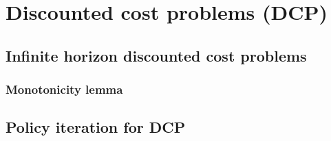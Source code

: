 \section{Discounted cost problems (DCP)}

\subsection{Infinite horizon discounted cost problems}

\subsubsection{Monotonicity lemma}

\subsection{Policy iteration for DCP}
